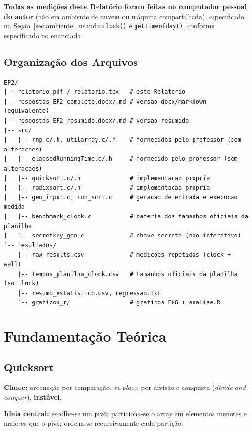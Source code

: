 \documentclass[11pt,a4paper]{article}
\renewcommand{\_}{\underscoreoriginal\allowbreak}
\begin{document}
\textbf{Todas as medições deste Relatório foram feitas no computador
pessoal do autor} (não em ambiente de nuvem ou máquina compartilhada),
especificado na Seção~\ref{sec:ambiente}, usando \texttt{clock()} e
\texttt{gettimeofday()}, conforme especificado no enunciado.

\subsection{Organização dos Arquivos}

\begin{lstlisting}
EP2/
|-- relatorio.pdf / relatorio.tex   # este Relatorio
|-- respostas_EP2_completo.docx/.md # versao docx/markdown (equivalente)
|-- respostas_EP2_resumido.docx/.md # versao resumida
|-- src/
|   |-- rng.c/.h, utilarray.c/.h    # fornecidos pelo professor (sem alteracoes)
|   |-- elapsedRunningTime.c/.h     # fornecido pelo professor (sem alteracoes)
|   |-- quicksort.c/.h              # implementacao propria
|   |-- radixsort.c/.h              # implementacao propria
|   |-- gen_input.c, run_sort.c     # geracao de entrada e execucao medida
|   |-- benchmark_clock.c           # bateria dos tamanhos oficiais da planilha
|   `-- secretkey_gen.c             # chave secreta (nao-interativo)
`-- resultados/
    |-- raw_results.csv             # medicoes repetidas (clock + wall)
    |-- tempos_planilha_clock.csv   # tamanhos oficiais da planilha (so clock)
    |-- resumo_estatistico.csv, regressao.txt
    `-- graficos_r/                 # graficos PNG + analise.R
\end{lstlisting}

\section{Fundamentação Teórica}

\subsection{Quicksort}

\textbf{Classe:} ordenação por comparação, \emph{in-place}, por divisão e
conquista (\emph{divide-and-conquer}), \textbf{instável}.

\textbf{Ideia central:} escolhe-se um pivô; particiona-se o array em
elementos menores e maiores que o pivô; ordena-se recursivamente cada
partição.
\end{document}
